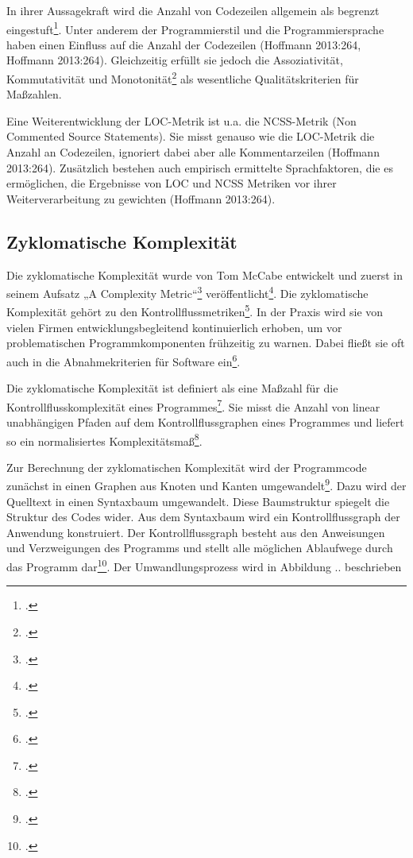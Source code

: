 In ihrer Aussagekraft wird die Anzahl von Codezeilen allgemein als
begrenzt eingestuft\footcite[Vgl. ][]{Hoffmann 2013:264, Rumreich and Kecskemety
  2019:2}. Unter anderem der Programmierstil und die Programmiersprache
haben einen Einfluss auf die Anzahl der Codezeilen (Hoffmann 2013:264,
Hoffmann 2013:264). Gleichzeitig erfüllt sie jedoch die Assoziativität,
Kommutativität und Monotonität\footcite[Vgl. ][]{zuseSoftwareComplexityMeasures1991
  S. 142} als wesentliche Qualitätskriterien für Maßzahlen.

Eine Weiterentwicklung der LOC-Metrik ist u.a. die NCSS-Metrik (Non
Commented Source Statements). Sie misst genauso wie die LOC-Metrik die
Anzahl an Codezeilen, ignoriert dabei aber alle Kommentarzeilen
(Hoffmann 2013:264). Zusätzlich bestehen auch empirisch ermittelte
Sprachfaktoren, die es ermöglichen, die Ergebnisse von LOC und NCSS
Metriken vor ihrer Weiterverarbeitung zu gewichten (Hoffmann 2013:264).

\subsection{Zyklomatische Komplexität}\label{Zyklomatische-Komplexitat}

Die zyklomatische Komplexität wurde von Tom McCabe entwickelt und zuerst
in seinem Aufsatz „A Complexity Metric``\footcite[Vgl. ][]{(McCabe 76)}
veröffentlicht\footcite[Vgl. ][]{(Sneed et al 2010:185).}. Die zyklomatische
Komplexität gehört zu den Kontrollflussmetriken\footcite[Vgl. ][]{(Ebert
  1996:88).}. In der Praxis wird sie von vielen Firmen
entwicklungsbegleitend kontinuierlich erhoben, um vor problematischen
Programmkomponenten frühzeitig zu warnen. Dabei fließt sie oft auch in
die Abnahmekriterien für Software ein\footcite[Vgl. ][]{(Hoffmann 2013:275).}.

Die zyklomatische Komplexität ist definiert als eine Maßzahl für die
Kontrollflusskomplexität eines Programmes\footcite[Vgl. ][]{(Rumreich and
  Kecskemety 2019:2, Jones 2008:335).}. Sie misst die Anzahl von linear
unabhängigen Pfaden auf dem Kontrollflussgraphen eines Programmes und
liefert so ein normalisiertes Komplexitätsmaß\footcite[Vgl. ][]{(Rumreich and
  Kecskemety 2019:2 (Quelle 15 dort)).}.

Zur Berechnung der zyklomatischen Komplexität wird der Programmcode
zunächst in einen Graphen aus Knoten und Kanten umgewandelt\footcite[Vgl. ][]{(Sneed
  et al 2010:185, Jones 2008:335).}. Dazu wird der Quelltext in einen
Syntaxbaum umgewandelt. Diese Baumstruktur spiegelt die Struktur des
Codes wider. Aus dem Syntaxbaum wird ein Kontrollflussgraph der
Anwendung konstruiert. Der Kontrollflussgraph besteht aus den
Anweisungen und Verzweigungen des Programms und stellt alle möglichen
Ablaufwege durch das Programm dar\footcite[Vgl. ][]{rackeKontrollflussdiagramme2017}.
Der Umwandlungsprozess wird in Abbildung .. beschrieben

